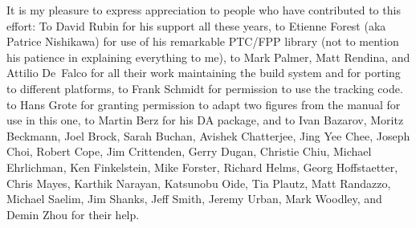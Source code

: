 It is my pleasure to express appreciation to people who have
contributed to this effort: To David Rubin for his support all these
years, to Etienne Forest (aka Patrice Nishikawa)
for use of his remarkable PTC/FPP
library (not to mention his patience in explaining everything to me), to
Mark Palmer, Matt Rendina, and Attilio De~Falco
for all their work maintaining the build
system and for porting \bmad to different platforms, to Frank Schmidt for
permission to use the \mad tracking code. to Hans Grote for granting
permission to adapt two figures from the \mad manual for use in this
one, to Martin Berz for his DA package, and to Ivan Bazarov, Moritz
Beckmann, Joel Brock, Sarah Buchan, Avishek Chatterjee, Jing Yee Chee, 
Joseph Choi, Robert Cope, Jim Crittenden, Gerry Dugan, Christie Chiu, 
Michael Ehrlichman, Ken Finkelstein, Mike Forster, Richard Helms, Georg
Hoffstaetter, Chris Mayes, Karthik Narayan, Katsunobu Oide,
Tia Plautz, Matt Randazzo,
Michael Saelim, Jim Shanks, Jeff Smith, Jeremy Urban, Mark Woodley,
and Demin Zhou for their help.

